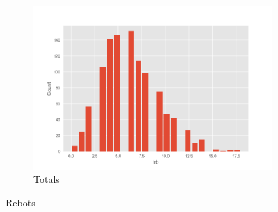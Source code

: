 \documentclass{article}
\begin{document}
\begin{figure}[!h]
\begin{subfigure}[b]{0.25\textwidth}
		\includegraphics[width=\textwidth]{hist18}
		\caption*{Totals}
		\label{fig:hist18}
	\end{subfigure}
	\caption{Rebots}
	\label{fig:tirs}
\end{figure}
\end{document}
